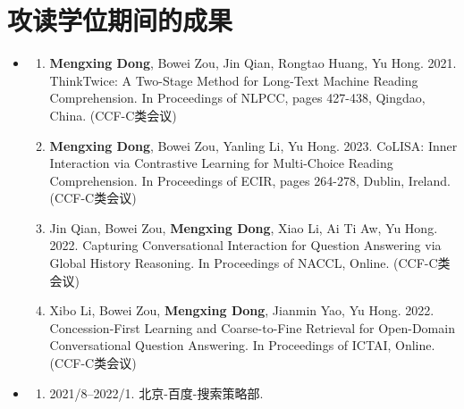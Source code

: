 \chapter{攻读学位期间的成果}

\begin{itemize}
	\setlength{\itemsep}{5pt}
	
	\item \textbf{\heiti{}}
	      \begin{enumerate}
	      	\setlength{\itemsep}{-\itemsep}  %
	      	
	      	\item \textbf{Mengxing Dong}, Bowei Zou, Jin Qian, Rongtao Huang, Yu Hong. 2021.
	      	      ThinkTwice: A Two-Stage Method for Long-Text Machine Reading Comprehension.
	      	      In Proceedings of NLPCC, pages 427-438, Qingdao, China. (CCF-C类会议)
	      	      
	      	\item \textbf{Mengxing Dong}, Bowei Zou, Yanling Li, Yu Hong. 2023.
	      	      CoLISA: Inner Interaction via Contrastive Learning for Multi-Choice Reading Comprehension.
	      	      In Proceedings of ECIR, pages 264-278, Dublin, Ireland. (CCF-C类会议)
	      	      
	      	\item Jin Qian, Bowei Zou, \textbf{Mengxing Dong}, Xiao Li, Ai Ti Aw, Yu Hong. 2022.
	      	      Capturing Conversational Interaction for Question Answering via Global History Reasoning.
	      	      In Proceedings of NACCL, Online. (CCF-C类会议)
	      	      
	      	\item Xibo Li, Bowei Zou, \textbf{Mengxing Dong}, Jianmin Yao, Yu Hong. 2022.
	      	      Concession-First Learning and Coarse-to-Fine Retrieval for Open-Domain Conversational Question Answering.
                  In Proceedings of ICTAI, Online. (CCF-C类会议)
	      	      
	      \end{enumerate}
	      
	      
	\item \textbf{\heiti{}}
	      \begin{enumerate}
	      	\item \textsc{2021/8--2022/1}. 北京-百度-搜索策略部.
	      \end{enumerate}
	      
\end{itemize}
